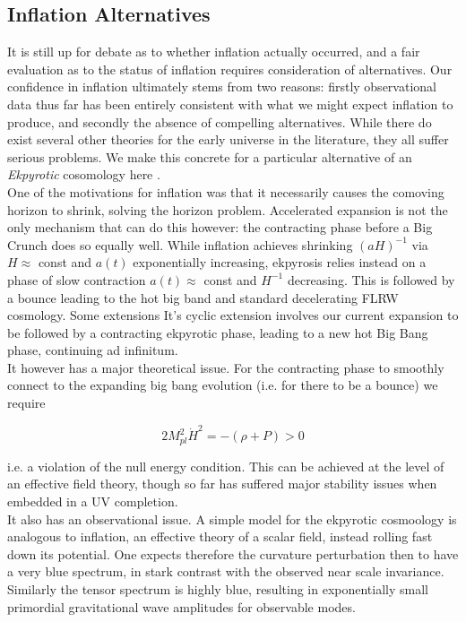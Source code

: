 \documentclass[a4paper,10pt]{article}
\newcommand{\Mp}{M_{pl}}
\begin{document}
\subsection{Inflation Alternatives}

It is still up for debate as to whether inflation actually occurred, and a fair evaluation as to the status of inflation requires consideration of alternatives. Our confidence in inflation ultimately stems from two reasons: firstly observational data thus far has been entirely consistent with what we might expect inflation to produce, and secondly the absence of compelling alternatives. While there do exist several other theories for the early universe in the literature, they all suffer serious problems. We make this concrete for a particular alternative of an \textit{Ekpyrotic} cosomology here \cite{CMBPol}.\\

One of the motivations for inflation was that it necessarily causes the comoving horizon to shrink, solving the horizon problem. Accelerated expansion is not the only mechanism that can do this however: the contracting phase before a Big Crunch does so equally well. While inflation achieves shrinking $(aH)^{-1}$ via $H\approx$ const and $a(t)$ exponentially increasing, ekpyrosis relies instead on a phase of slow contraction $a(t)\approx$ const and $H^{-1}$ decreasing. This is followed by a bounce leading to the hot big band and standard decelerating FLRW cosmology. Some extensions It's cyclic extension involves our current expansion to be followed by a contracting ekpyrotic phase, leading to a new hot Big Bang phase, continuing ad infinitum.\\

It however has a major theoretical issue. For the contracting phase to smoothly connect to the expanding big bang evolution (i.e. for there to be a bounce) we require

\begin{equation}
2\Mp^2\dot{H}^2 = -(\rho + P) > 0
\end{equation} 

i.e. a violation of the null energy condition. This can be achieved at the level of an effective field theory, though so far has suffered major stability issues when embedded in a UV completion.\\

It also has an observational issue. A simple model for the ekpyrotic cosmoology is analogous to inflation, an effective theory of a scalar field, instead rolling fast down its potential. One expects therefore the curvature perturbation then to have a very blue spectrum, in stark contrast with the observed near scale invariance. Similarly the tensor spectrum is highly blue, resulting in exponentially small primordial gravitational wave amplitudes for observable modes. \\
\end{document}
